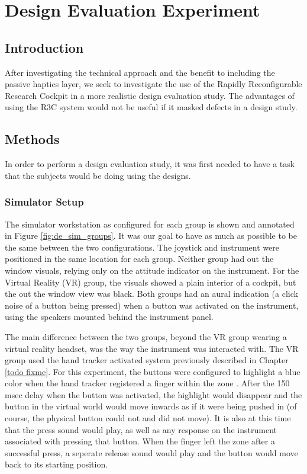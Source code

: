 \chapter{Design Evaluation Experiment}

\section{Introduction}

After investigating the technical approach and the benefit to including the passive haptics layer, we seek to investigate the use of the Rapidly Reconfigurable Research Cockpit in a more realistic design evaluation study.
The advantages of using the R3C system would not be useful if it masked defects in a design study.

\section{Methods}

In order to perform a design evaluation study, it was first needed to have a task that the subjects would be doing using the designs.

\subsection{Simulator Setup}

The simulator workstation as configured for each group is shown and annotated in Figure \ref{fig:de_sim_groups}.
It was our goal to have as much as possible to be the same between the two configurations.
The joystick and instrument were positioned in the same location for each group.
Neither group had out the window visuals, relying only on the attitude indicator on the instrument.
For the Virtual Reality (VR) group, the visuals showed a plain interior of a cockpit, but the out the window view was black.
Both groups had an aural indication (a click noise of a button being pressed) when a button was activated on the instrument, using the speakers mounted behind the instrument panel.

The main difference between the two groups, beyond the VR group wearing a virtual reality headset, was the way the instrument was interacted with.
The VR group used the hand tracker activated system previously described in Chapter \ref{todo fixme}.
For this experiment, the buttons were configured to highlight a blue color when the hand tracker registered a finger within the zone .
After the 150 msec delay when the button was activated, the highlight would disappear and the button in the virtual world would move inwards as if it were being pushed in (of course, the physical button could not and did not move).
It is also at this time that the press sound would play, as well as any response on the instrument associated with pressing that button.
When the finger left the zone after a successful press, a seperate release sound would play and the button would move back to its starting position.

